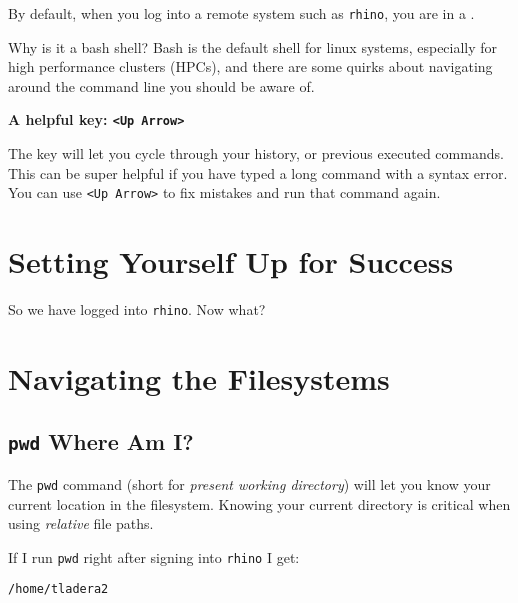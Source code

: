 \documentclass[
  letterpaper,
  DIV=11,
  numbers=noendperiod]{scrreprt}
\begin{document}
By default, when you log into a remote system such as \texttt{rhino},
you are in a .

Why is it a bash shell? Bash is the default shell for linux systems,
especially for high performance clusters (HPCs), and there are some
quirks about navigating around the command line you should be aware of.

\begin{tcolorbox}[enhanced jigsaw, breakable, leftrule=.75mm, colframe=quarto-callout-color-frame, left=2mm, toprule=.15mm, arc=.35mm, rightrule=.15mm, opacityback=0, bottomrule=.15mm, colback=white]

\vspace{-3mm}\textbf{A helpful key: \texttt{\textless{}Up\ Arrow\textgreater{}}}\vspace{3mm}

The key will let you cycle through your history, or previous executed
commands. This can be super helpful if you have typed a long command
with a syntax error. You can use
\texttt{\textless{}Up\ Arrow\textgreater{}} to fix mistakes and run that
command again.

\end{tcolorbox}

\section{Setting Yourself Up for
Success}\label{setting-yourself-up-for-success}

So we have logged into \texttt{rhino}. Now what?

\section{Navigating the Filesystems}\label{navigating-the-filesystems}

\subsection{\texorpdfstring{\texttt{pwd} Where Am
I?}{pwd Where Am I?}}\label{pwd-where-am-i}

The \texttt{pwd} command (short for \emph{present working directory})
will let you know your current location in the filesystem. Knowing your
current directory is critical when using \emph{relative} file paths.

If I run \texttt{pwd} right after signing into \texttt{rhino} I get:

\begin{verbatim}
/home/tladera2
\end{verbatim}
\end{document}
